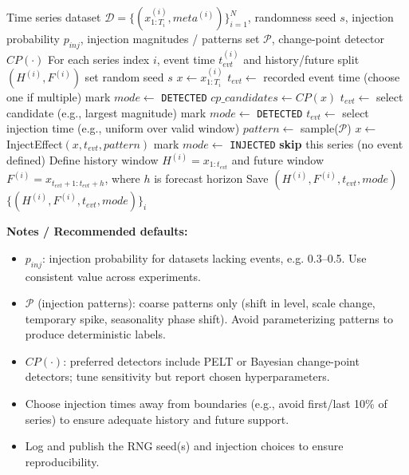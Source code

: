 \begin{algorithm}[H]
\caption{Event Generation: Injection \textbf{or} Detection}
\label{alg:event_gen}
\begin{algorithmic}[1]
\REQUIRE Time series dataset $\mathcal{D} = \{(x^{(i)}_{1:T_i}, meta^{(i)})\}_{i=1}^N$, randomness seed $s$, injection probability $p_{inj}$, injection magnitudes / patterns set $\mathcal{P}$, change-point detector $CP(\cdot)$
\ENSURE For each series index $i$, event time $t^{(i)}_{evt}$ and history/future split $(H^{(i)}, F^{(i)})$
\STATE set random seed $s$
    \STATE $x \leftarrow x^{(i)}_{1:T_i}$
        \STATE $t_{evt} \leftarrow$ recorded event time (choose one if multiple)
        \STATE mark $mode \leftarrow$ \texttt{DETECTED}
    \ELSE
        \STATE $cp\_candidates \leftarrow CP(x)$ 
            \STATE $t_{evt} \leftarrow$ select candidate (e.g., largest magnitude)
            \STATE mark $mode \leftarrow$ \texttt{DETECTED}
        \ELSE
                \STATE $t_{evt} \leftarrow$ select injection time (e.g., uniform over valid window)
                \STATE $pattern \leftarrow$ sample($\mathcal{P}$)
                \STATE $x \leftarrow$ InjectEffect$(x, t_{evt}, pattern)$
                \STATE mark $mode \leftarrow$ \texttt{INJECTED}
            \ELSE
                \STATE \textbf{skip} this series (no event defined)
            \ENDIF
        \ENDIF
    \ENDIF
    \STATE Define history window $H^{(i)} = x_{1:t_{evt}}$ and future window $F^{(i)} = x_{t_{evt}+1 : t_{evt}+h}$, where $h$ is forecast horizon
    \STATE Save $(H^{(i)}, F^{(i)}, t_{evt}, mode)$
\ENDFOR
\RETURN $\{(H^{(i)}, F^{(i)}, t_{evt}, mode)\}_{i}$
\end{algorithmic}
\end{algorithm}

\vspace{6pt}
\noindent\textbf{Notes / Recommended defaults:}
\begin{itemize}
  \item $p_{inj}$: injection probability for datasets lacking events, e.g. 0.3--0.5. Use consistent value across experiments.
  \item $\mathcal{P}$ (injection patterns): coarse patterns only (shift in level, scale change, temporary spike, seasonality phase shift). Avoid parameterizing patterns to produce deterministic labels.
  \item $CP(\cdot)$: preferred detectors include PELT or Bayesian change-point detectors; tune sensitivity but report chosen hyperparameters.
  \item Choose injection times away from boundaries (e.g., avoid first/last 10\% of series) to ensure adequate history and future support.
  \item Log and publish the RNG seed(s) and injection choices to ensure reproducibility.
\end{itemize}

